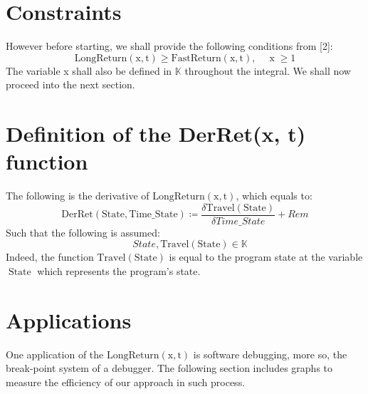 \documentclass[10pt, twocolumn]{article}
\theoremstyle{plain}
\theoremstyle{definition}
\theoremstyle{remark}
\begin{document}
\section{Constraints}

However before starting, we shall provide the following conditions from [2]:
\begin{equation}
    \operatorname{LongReturn(x, t)} \geq \operatorname{FastReturn(x, t)}, \quad \operatorname{x} \geq 1
\end{equation}
The variable x shall also be defined in $\mathbb{K}$ throughout the integral. We shall now proceed into the next section.

\section{Definition of the DerRet(x, t) function}

The following is the derivative of $\operatorname{LongReturn(x, t)}$, which equals to:
\begin{equation}
    \operatorname{DerRet(State, Time\_State)} \coloneqq \frac{\delta \operatorname{Travel(State)}}{\delta Time\_State} + Rem
\end{equation}
Such that the following is assumed:
\begin{equation}
    \quad State, \operatorname{Travel(State)} \in \mathbb{K}
\end{equation}
Indeed, the function $\operatorname{Travel(State)}$ is equal to the program state at the variable $\operatorname{State}$ which represents the program's state.

\section{Applications}

One application of the $\operatorname{LongReturn(x, t)}$ is software debugging, more so, the break-point system of a debugger. The following section includes graphs to measure the efficiency of our approach in such process.
\end{document}
